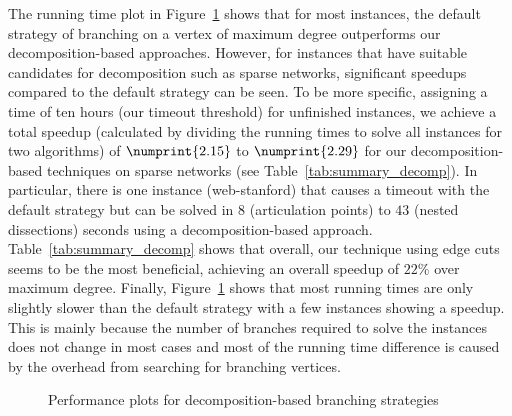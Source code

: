 \documentclass[a4paper,UKenglish,cleveref, autoref, thm-restate]{lipics-v2021}
\begin{document}
The running time plot in Figure~\ref{fig:all_decomp} shows that for most instances, the default strategy of branching on a
vertex of maximum degree outperforms our decomposition-based approaches.
However, for instances that have suitable candidates for decomposition such as
sparse networks, significant speedups compared to the default strategy can be
seen. To be more specific, assigning a time of ten hours (our timeout threshold) for unfinished
instances, we achieve a total speedup (calculated by dividing the running times
to solve all instances for two algorithms) of $\numprint{2.15}$ to $\numprint{2.29}$ for our
decomposition-based techniques on sparse networks (see
Table~\ref{tab:summary_decomp}). In particular, there is one instance (web-stanford) that causes a timeout with the
default strategy but can be solved in $8$ (articulation points) to $43$ (nested
dissections) seconds using a decomposition-based approach. Table~\ref{tab:summary_decomp} shows that overall, our
technique using edge cuts seems to be the most beneficial, achieving an overall
speedup of $22\%$ over maximum degree.
Finally, Figure~\ref{fig:all_decomp} shows that most running
times are only slightly slower than the default strategy with a few instances
showing a speedup. This is mainly because
the number of branches required to solve the instances does not change in most
cases and most of the running time
difference is caused by the overhead from
searching for branching vertices.%



\begin{figure}[t!]
\begin{subfigure}[t!]{\textwidth}
	\centering
	
\end{subfigure}

\begin{subfigure}[t!]{\textwidth}
	\centering
	
\end{subfigure}
\caption{Performance plots for decomposition-based branching strategies}\label{fig:all_decomp}
\end{figure}
\end{document}
